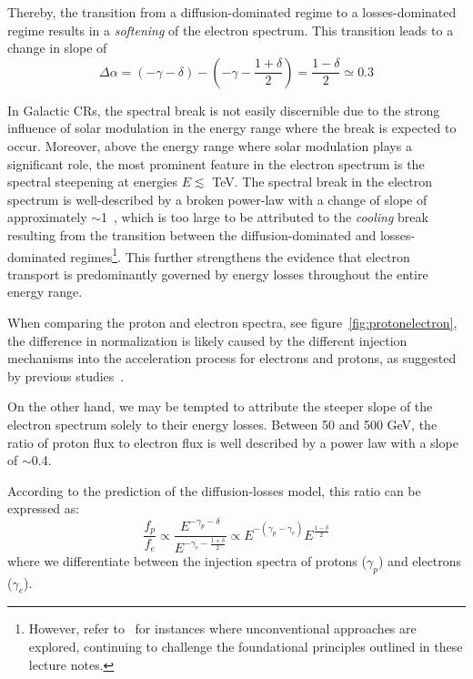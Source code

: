 Thereby, the transition from a diffusion-dominated regime to a losses-dominated regime results in a \emph{softening} of the electron spectrum. This transition leads to a change in slope of
%
\begin{equation}
\Delta \alpha = (-\gamma-\delta) - (-\gamma-\frac{1 + \delta}{2}) = \frac{1 -\delta}{2} \simeq 0.3
\end{equation}

In Galactic CRs, the spectral break is not easily discernible due to the strong influence of solar modulation in the energy range where the break is expected to occur. 
%
Moreover, above the energy range where solar modulation plays a significant role, the most prominent feature in the electron spectrum is the spectral steepening at energies $E \lesssim$ TeV. The spectral break in the electron spectrum is well-described by a broken power-law with a change of slope of approximately $\sim$1~\cite{HESS.2008.leptons,DAMPE.2017.leptons,CALET.2018.leptons}, which is too large to be attributed to the \emph{cooling} break resulting from the transition between the diffusion-dominated and losses-dominated regimes\footnote{However, refer to~\cite{Cowsik1979apj,Lipari2017prd} for instances where unconventional approaches are explored, continuing to challenge the foundational principles outlined in these lecture notes.}. 
%
This further strengthens the evidence that electron transport is predominantly governed by energy losses throughout the entire energy range.

When comparing the proton and electron spectra, see figure~\ref{fig:protonelectron}, the difference in normalization is likely caused by the different injection mechanisms into the acceleration process for electrons and protons, as suggested by previous studies~\cite{Morlino2021mnras}.

On the other hand, we may be tempted to attribute the steeper slope of the electron spectrum solely to their energy losses.
%
Between 50 and 500 GeV, the ratio of proton flux to electron flux is well described by a power law with a slope of $\sim$0.4.

According to the prediction of the diffusion-losses model, this ratio can be expressed as:
%
\begin{equation}
\frac{f_p}{f_e} \propto \frac{E^{-\gamma_p-\delta}}{E^{{-\gamma_e}-\frac{1 + \delta}{2}}} \propto E^{-(\gamma_p-\gamma_e)} E^{\frac{1-\delta}{2}}
\end{equation}
%
where we differentiate between the injection spectra of protons ($\gamma_p$) and electrons ($\gamma_e$).

